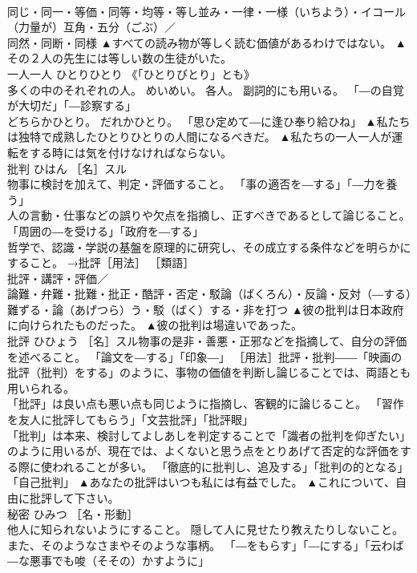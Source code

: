 \documentclass[8pt]{extreport}
\begin{document}
\begin{CJK}{UTF8}{min}
\\	同じ・同一・等価・同等・均等・等し並み・一律・一様（いちよう）・イコール（力量が）互角・五分（ごぶ）／
\\	同然・同断・同様	▲すべての読み物が等しく読む価値があるわけではない。 ▲その２人の先生には等しい数の生徒がいた。
\\	一人一人	ひとりひとり	《「ひとりびとり」とも》 
\\	多くの中のそれぞれの人。 めいめい。 各人。 副詞的にも用いる。 「―の自覚が大切だ」「―診察する」 
\\	どちらかひとり。 だれかひとり。 「思ひ定めて―に逢ひ奉り給ひね」	▲私たちは独特で成熟したひとりひとりの人間になるべきだ。 ▲私たちの一人一人が運転をする時には気を付けなければならない。
\\	批判	ひはん	［名］スル 
\\	物事に検討を加えて、判定・評価すること。 「事の適否を―する」「―力を養う」 
\\	人の言動・仕事などの誤りや欠点を指摘し、正すべきであるとして論じること。 「周囲の―を受ける」「政府を―する」 
\\	哲学で、認識・学説の基盤を原理的に研究し、その成立する条件などを明らかにすること。 →批評［用法］ ［類語］
\\	批評・講評・評価／
\\	論難・弁難・批難・批正・酷評・否定・駁論（ばくろん）・反論・反対（―する）難ずる・論（あげつら）う・駁（ばく）する・非を打つ	▲彼の批判は日本政府に向けられたものだった。 ▲彼の批判は場違いであった。
\\	批評	ひひょう	［名］スル物事の是非・善悪・正邪などを指摘して、自分の評価を述べること。 「論文を―する」「印象―」 ［用法］批評・批判――「映画の批評（批判）をする」のように、事物の価値を判断し論じることでは、両語とも用いられる。 
\\	「批評」は良い点も悪い点も同じように指摘し、客観的に論じること。 「習作を友人に批評してもらう」「文芸批評」「批評眼」
\\	「批判」は本来、検討してよしあしを判定することで「識者の批判を仰ぎたい」のように用いるが、現在では、よくないと思う点をとりあげて否定的な評価をする際に使われることが多い。 「徹底的に批判し、追及する」「批判の的となる」「自己批判」	▲あなたの批評はいつも私には有益でした。 ▲これについて、自由に批評して下さい。
\\	秘密	ひみつ	［名・形動］ 
\\	他人に知られないようにすること。 隠して人に見せたり教えたりしないこと。 また、そのようなさまやそのような事柄。 「―をもらす」「―にする」「云わば―な悪事でも唆（そその）かすように」 

\end{CJK}
\end{document}
